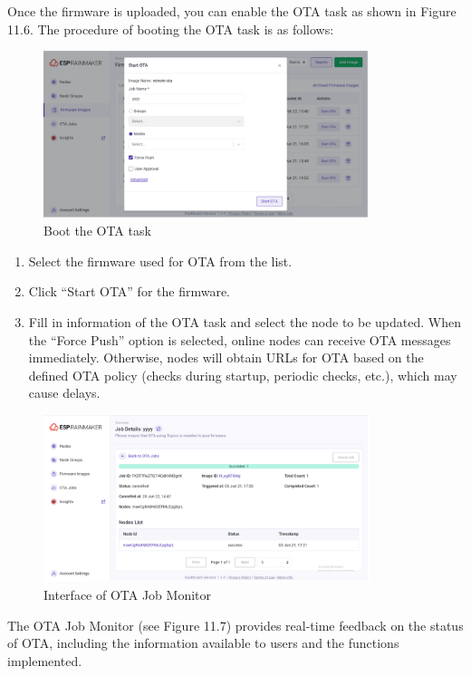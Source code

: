 \documentclass[a4paper,12pt,openany]{book}
\begin{document}
Once the firmware is uploaded, you can enable the OTA task as shown in Figure 11.6. The procedure of booting the OTA task is as follows:

\begin{figure}[h!]
    \centering
    \includegraphics[width=0.85\textwidth]{D11Z/11-6}
    \caption{Boot the OTA task}
\end{figure}

\begin{enumerate}[label=(\arabic*)]
    \item Select the firmware used for OTA from the list.
    \item Click “Start OTA” for the firmware.
    \item Fill in information of the OTA task and select the node to be updated. When the “Force Push” option is selected, online nodes can receive OTA messages immediately. Otherwise, nodes will obtain URLs for OTA based on the defined OTA policy (checks during startup, periodic checks, etc.), which may cause delays.
\end{enumerate}

\begin{figure}[h!]
    \centering
    \includegraphics[width=0.85\textwidth,frame]{D11Z/11-7}
    \caption{ Interface of OTA Job Monitor}
\end{figure}

The OTA Job Monitor (see Figure 11.7) provides real-time feedback on the status of OTA, including the information available to users and the functions implemented.
\end{document}
